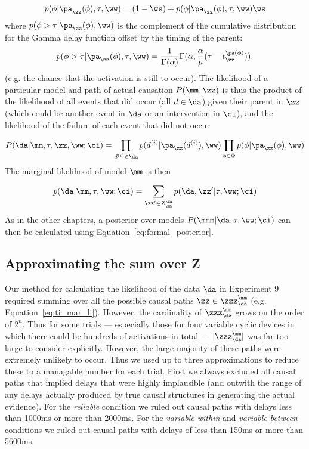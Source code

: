\begin{equation}
p(\phi |\pa_{\zz}(\phi), \tau, \ww) = (1-\ws) +  p(\phi |\pa_{\zz}(\phi), \tau, \ww)\ws
\end{equation}
where $p(\phi>\tau |\pa_{\zz}(\phi), \ww)$ is the complement of the cumulative distribution for the Gamma delay function offset by the timing of the parent:
\begin{equation}
	p(\phi>\tau |\pa_{\zz}(\phi), \tau, \ww) = \frac{1}{\Gamma(\alpha)}\Gamma(\alpha, \frac{\alpha}{\mu}(\tau - t^{\pa(\phi)}_{\zz}) ) .
\end{equation}
(e.g. the chance that the activation is still to occur).  The likelihood of a particular model and path of actual causation $P(\mm, \zz)$ is thus the product of the likelihood of all events that did occur (all $d\in\da$) given their parent in $\zz$ (which could be another event in $\da$ or an intervention in $\ci$), and the likelihood of the failure of each event that did not occur

\begin{equation}
	P(\da|\mm,\tau,\zz,\ww;\ci) = \prod_{d^{(i)}\in\da} p(d^{(i)}|\pa_{\zz}(d^{(i)}), \ww) \prod_{\phi \in \Phi} p(\phi |\pa_{\zz}(\phi), \ww)
\end{equation}
 The marginal likelihood of model $\mm$ is then

\begin{equation}
p(\da|\mm,\tau,\ww;\ci) = \sum_{\zz^\prime \in Z^{\da}_{\mm}}p(\da,{\zz}^{\prime} |\tau,\ww;\ci)
\label{eq:ti_mar_li}
\end{equation}
As in the other chapters, a posterior over models $P(\mmm|\da,\tau,\ww;\ci)$ can then be calculated using Equation~\ref{eq:formal_posterior}.

\subsection{Approximating the sum over \textbf{Z}}

Our method for calculating the likelihood of the data $\da$ in Experiment 9 required summing over all the possible causal paths $\zz\in \zzz_{\da}^{\mm}$ (e.g. Equation~\ref{eq:ti_mar_li}).  However, the cardinality of $\zzz_{\da}^{\mm}$ grows on the order of $2^n$.  Thus for some trials --- especially those for four variable cyclic devices in which there could be hundreds of activations in total --- $|\zzz_{\da}^{\mm}|$ was far too large to consider explicitly.  However, the large majority of these paths were extremely unlikely to occur.  Thus we used up to three approximations to reduce these to a managable number for each trial.  First we always excluded all causal paths that implied delays that were highly implausible (and outwith the range of any delays actually produced by true causal structures in generating the actual evidence).  For the \emph{reliable} condition we ruled out causal paths with delays less than 1000ms or more than 2000ms.  For the \emph{variable-within} and \emph{variable-between} conditions we ruled out causal paths with delays of less than 150ms or more than 5600ms.

